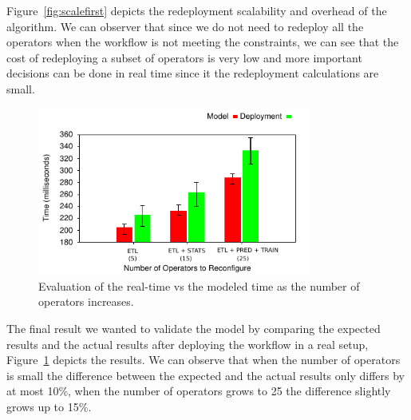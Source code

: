 Figure~\ref{fig:scalefirst} depicts the redeployment scalability and overhead of the algorithm. We can observer that since we do not need to redeploy all the operators when the workflow is not meeting the constraints, we can see that the cost of redeploying a subset of operators is very low and more important decisions can be done in real time since it the redeployment calculations are small.

\begin{figure}[h]
  \centering
  \includegraphics[width=0.8\textwidth]{Results/Time.pdf}
  \caption{Evaluation of the real-time vs the modeled time as the number of operators increases.}\label{fig:validation} 
\end{figure}

The final result we wanted to validate the model by comparing the expected results and the actual results after deploying the workflow in a real setup, Figure~\ref{fig:validation} depicts the results. We can observe that when the number of operators is small the difference between the expected and the actual results only differs by at most 10\%, when the number of operators grows to 25 the difference slightly grows up to 15\%.
